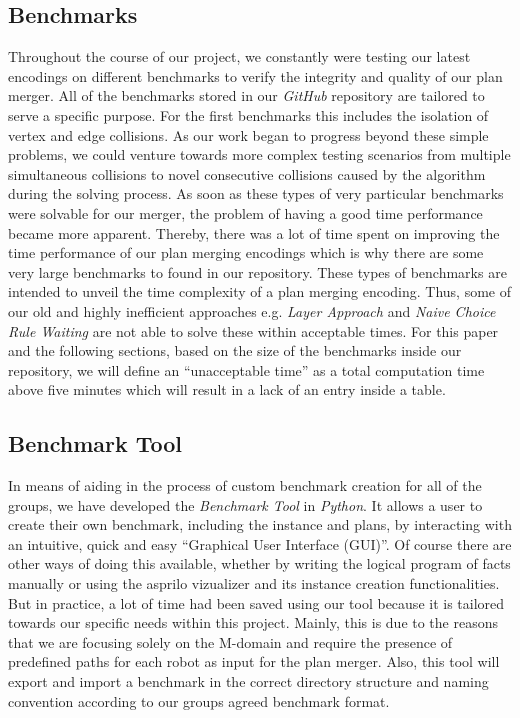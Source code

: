 \documentclass{llncs}
\begin{document}
\subsection{Benchmarks}
Throughout the course of our project, we constantly were testing our latest encodings on different benchmarks to verify the integrity and quality of our plan merger. All of the benchmarks stored in our \emph{GitHub} repository \cite{project1} are tailored to serve a specific purpose. For the first benchmarks this includes the isolation of vertex and edge collisions. As our work began to progress beyond these simple problems, we could venture towards more complex testing scenarios from multiple simultaneous collisions to novel consecutive collisions caused by the algorithm during the solving process. As soon as these types of very particular benchmarks were solvable for our merger, the problem of having a good time performance became more apparent. Thereby, there was a lot of time spent on improving the time performance of our plan merging encodings which is why there are some very large benchmarks to found in our repository. These types of benchmarks are intended to unveil the time complexity of a plan merging encoding. Thus, some of our old and highly inefficient approaches e.g. \emph{Layer Approach} and \emph{Naive Choice Rule Waiting} are not able to solve these within acceptable times.
For this paper and the following sections, based on the size of the benchmarks inside our repository, we will define an ``unacceptable time'' as a total computation time above five minutes which will result in a lack of an entry inside a table.



\subsection{Benchmark Tool}
In means of aiding in the process of custom benchmark creation for all of the groups, we have developed the \emph{Benchmark Tool}\cite{project1} in \emph{Python}. It allows a user to create their own benchmark, including the instance and plans, by interacting with an intuitive, quick and easy ``Graphical User Interface (GUI)''. Of course there are other ways of doing this available, whether by writing the logical program of facts manually or using the asprilo vizualizer and its instance creation functionalities. But in practice, a lot of time had been saved using our tool because it is tailored towards our specific needs within this project. Mainly, this is due to the reasons that we are focusing solely on the M-domain and require the presence of predefined paths for each robot as input for the plan merger. Also, this tool will export and import a benchmark in the correct directory structure and naming convention according to our groups agreed benchmark format.
\end{document}
